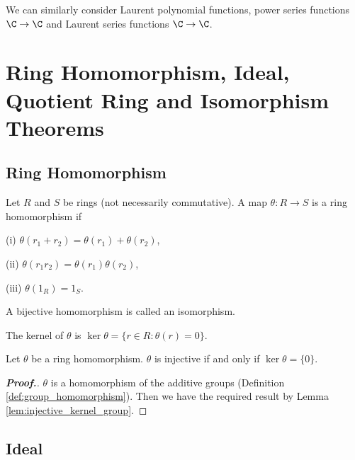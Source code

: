 \begin{remark}
We can similarly consider Laurent polynomial functions, power series functions $\C \to \C$ and Laurent series functions $\C \to \C$.
\end{remark}


\section{Ring Homomorphism, Ideal, Quotient Ring and Isomorphism Theorems}

\subsection{Ring Homomorphism}

\begin{definition}\label{def:ring_homomorphism_isomorphism}
Let $R$ and $S$ be rings (not necessarily commutative). A map $\theta : R \to S$ is a ring homomorphism if
\ben
\item [(i)] $\theta(r_1 + r_2) = \theta(r_1) + \theta(r_2)$,
\item [(ii)] $\theta(r_1r_2) = \theta(r_1)\theta(r_2)$,
\item [(iii)] $\theta(1_R) = 1_S$.
\een

A bijective homomorphism is called an isomorphism.
\end{definition}

\begin{definition}[kernel]\label{def:kernel_ring_homomorphism}
The kernel of $\theta$ is $\ker \theta = \{r \in R : \theta(r) = 0\}$.
\end{definition}

\begin{lemma}\label{lem:injective_kernel_ring}
Let $\theta$ be a ring homomorphism. $\theta$ is injective if and only if $\ker \theta = \{0\}$.
\end{lemma}

\begin{proof}[\bf Proof.]
$\theta$ is a homomorphism of the additive groups (Definition \ref{def:group_homomorphism}). Then we have the required result by Lemma \ref{lem:injective_kernel_group}.
\end{proof}

\subsection{Ideal}

